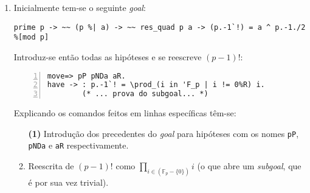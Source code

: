 \begin{enumerate}[label=\textbf{\roman*.}]


        \item Inicialmente tem-se o seguinte \textit{goal}:
                \begin{lstlisting}[language=coq,frame=single,tabsize=1]
prime p -> ~~ (p %| a) -> ~~ res_quad p a -> (p.-1`!) = a ^ p.-1./2 %[mod p]
                \end{lstlisting}
        Introduz-se então todas as hipóteses e se reescreve $(p-1)!$:
                \begin{lstlisting}[language=coq,frame=single, numbers=left,stepnumber=1,tabsize=1,name=proof]
move=> pP pNDa aR.
have -> : p.-1`! = \prod_(i in 'F_p | i != 0%R) i.
        (* ... prova do subgoal... *)
                \end{lstlisting}
        Explicando os comandos feitos em linhas específicas têm-se:
        \begin{enumerate}
                \item[\textbf{(1)}] Introdução dos precedentes do \textit{goal} para hipóteses com os nomes \lstinline[language=coq]|pP|, \lstinline[language=coq]|pNDa| e \lstinline[language=coq]|aR| respectivamente.
                
                \item[\textbf{(2)}] Reescrita de $(p-1)!$ como $\prod_{i \in (\mathbb{F}_p - \{0\})} i$ (o que abre um \textit{subgoal}, que é por sua vez trivial).
                
        \end{enumerate}



\end{enumerate}
